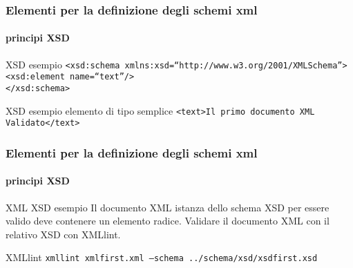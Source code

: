 \begin{frame}
    \frametitle{Elementi per la definizione degli schemi xml}
    \framesubtitle{principi XSD}
    \addtocounter{nframe}{1}




    \begin{block}{XSD esempio}
\texttt{<xsd:schema xmlns:xsd=``http://www.w3.org/2001/XMLSchema''>}
            \\\texttt{<xsd:element name=``text''/>}
        \\\texttt{</xsd:schema>}
    \end{block}

    \begin{block}{XSD esempio elemento di tipo semplice}
 \texttt{<text>Il primo documento XML Validato</text>}
     \end{block}


    
\end{frame}

\begin{frame}
    \frametitle{Elementi per la definizione degli schemi xml}
    \framesubtitle{principi XSD}
    \addtocounter{nframe}{1}

    \begin{block}{XML XSD esempio}
        Il documento XML istanza dello schema XSD per essere valido deve contenere un elemento radice.
        Validare il documento XML con il relativo XSD con XMLlint.
        
    \end{block}

    \begin{block}{XMLlint}
        \texttt{xmllint xmlfirst.xml --schema ../schema/xsd/xsdfirst.xsd}
    \end{block}
    
    
\end{frame}

